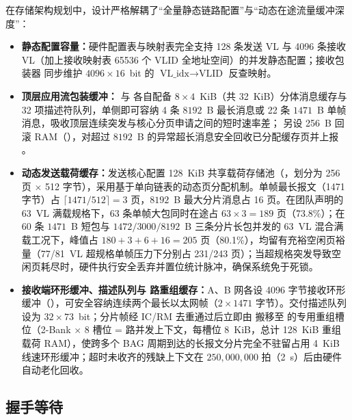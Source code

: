 在存储架构规划中，设计严格解耦了“全量静态链路配置”与“动态在途流量缓冲深度”：
\begin{itemize}
  \item \textbf{静态配置容量：}硬件配置表与映射表完全支持 128 条发送 VL 与 4096 条接收 VL（加上接收映射表 65536 个 VLID 全地址空间）的并发静态配置；接收包装器  同步维护 $4096\times 16$~bit 的 $\text{VL\_idx}\rightarrow\text{VLID}$ 反查映射。
  \item \textbf{顶层应用流包装缓冲：} 与  各自配备 $8\times 4$~KiB（共 32~KiB）分体消息缓存与 32 项描述符队列，单侧即可容纳 4 条 $8192$~B 最长消息或 22 条 $1471$~B 单帧消息，吸收顶层连续突发与核心分页申请之间的短时速率差； 另设 256~B 回滚 RAM（），对超过 $8192$~B 的异常超长消息安全回收已分配缓存页并上报 。
  \item \textbf{动态发送载荷缓存：}发送核心配置 128~KiB 共享载荷存储池（，划分为 256 页 $\times$ 512 字节），采用基于单向链表的动态页分配机制。单帧最长报文（1471 字节）占 $\lceil 1471/512 \rceil = 3$ 页，$8192$~B 最大分片消息占 16 页。在团队声明的 63~VL 满载规格下，63 条单帧大包同时在途占 $63\times 3 = 189$ 页（73.8\%）；在 60 条 $1471$~B 短包与 $1472/3000/8192$~B 三条分片长包并发的 63~VL 混合满载工况下，峰值占 $180 + 3 + 6 + 16 = 205$ 页（80.1\%），均留有充裕空闲页裕量（77/81~VL 超规格单帧压力下分别占 231/243 页）；当超规格突发导致空闲页耗尽时，硬件执行安全丢弃并置位统计脉冲，确保系统免于死锁。
  \item \textbf{接收端环形缓冲、描述队列与 \ReasmContexts{} 路重组缓存：}A、B 网各设 4096 字节接收环形缓冲（），可安全容纳连续两个最长以太网帧（$2\times 1471$ 字节）。交付描述队列  设为 $32\times 73$~bit；分片帧经 IC/RM 去重通过后立即由  搬移至  的专用重组槽位（2-Bank $\times$ 8 槽位 = \ReasmContexts{} 路并发上下文，每槽位 8~KiB，总计 128~KiB 重组载荷 RAM），使跨多个 BAG 周期到达的长报文分片完全不驻留占用 4~KiB 线速环形缓冲；超时未收齐的残缺上下文在 $250,000,000$ 拍（2~s）后由硬件自动老化回收。
\end{itemize}

\subsection{握手等待}

